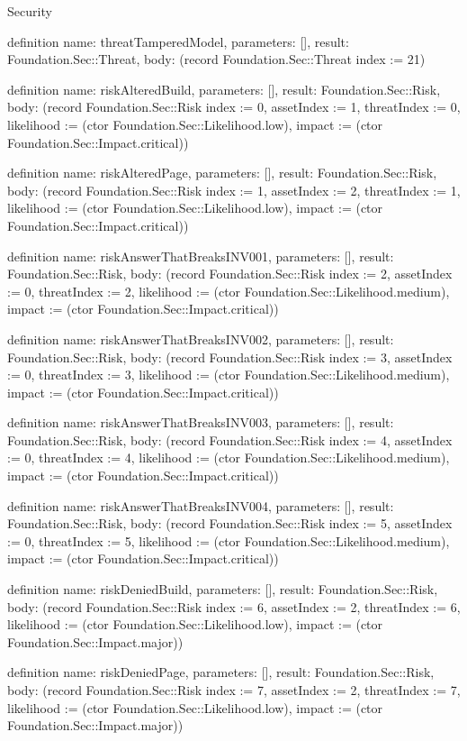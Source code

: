 \begin{lexlean}{Security}
\begin{semanticmodule}
definition{
  name: threatTamperedModel,
  parameters: [],
  result: Foundation.Sec::Threat,
  body: (record Foundation.Sec::Threat {index := 21})
}

definition{
  name: riskAlteredBuild,
  parameters: [],
  result: Foundation.Sec::Risk,
  body: (record Foundation.Sec::Risk {index := 0, assetIndex := 1, threatIndex := 0, likelihood := (ctor Foundation.Sec::Likelihood.low), impact := (ctor Foundation.Sec::Impact.critical)})
}

definition{
  name: riskAlteredPage,
  parameters: [],
  result: Foundation.Sec::Risk,
  body: (record Foundation.Sec::Risk {index := 1, assetIndex := 2, threatIndex := 1, likelihood := (ctor Foundation.Sec::Likelihood.low), impact := (ctor Foundation.Sec::Impact.critical)})
}

definition{
  name: riskAnswerThatBreaksINV001,
  parameters: [],
  result: Foundation.Sec::Risk,
  body: (record Foundation.Sec::Risk {index := 2, assetIndex := 0, threatIndex := 2, likelihood := (ctor Foundation.Sec::Likelihood.medium), impact := (ctor Foundation.Sec::Impact.critical)})
}

definition{
  name: riskAnswerThatBreaksINV002,
  parameters: [],
  result: Foundation.Sec::Risk,
  body: (record Foundation.Sec::Risk {index := 3, assetIndex := 0, threatIndex := 3, likelihood := (ctor Foundation.Sec::Likelihood.medium), impact := (ctor Foundation.Sec::Impact.critical)})
}

definition{
  name: riskAnswerThatBreaksINV003,
  parameters: [],
  result: Foundation.Sec::Risk,
  body: (record Foundation.Sec::Risk {index := 4, assetIndex := 0, threatIndex := 4, likelihood := (ctor Foundation.Sec::Likelihood.medium), impact := (ctor Foundation.Sec::Impact.critical)})
}

definition{
  name: riskAnswerThatBreaksINV004,
  parameters: [],
  result: Foundation.Sec::Risk,
  body: (record Foundation.Sec::Risk {index := 5, assetIndex := 0, threatIndex := 5, likelihood := (ctor Foundation.Sec::Likelihood.medium), impact := (ctor Foundation.Sec::Impact.critical)})
}

definition{
  name: riskDeniedBuild,
  parameters: [],
  result: Foundation.Sec::Risk,
  body: (record Foundation.Sec::Risk {index := 6, assetIndex := 2, threatIndex := 6, likelihood := (ctor Foundation.Sec::Likelihood.low), impact := (ctor Foundation.Sec::Impact.major)})
}

definition{
  name: riskDeniedPage,
  parameters: [],
  result: Foundation.Sec::Risk,
  body: (record Foundation.Sec::Risk {index := 7, assetIndex := 2, threatIndex := 7, likelihood := (ctor Foundation.Sec::Likelihood.low), impact := (ctor Foundation.Sec::Impact.major)})
}


\end{semanticmodule}
\end{lexlean}
